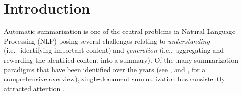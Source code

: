 \section{Introduction}

Automatic summarization is one of the central problems in Natural
Language Processing (NLP) posing several challenges relating to {\em
  understanding} (i.e.,~identifying important content) and {\em
  generation} (i.e.,~aggregating and rewording the identified
content into a summary). Of the many summarization paradigms that have
been identified over the years (see \citeauthor{mani2001automatic},
\citeyear{mani2001automatic} and \citeauthor{Nenkova:McKeown:2011},
\citeyear{Nenkova:McKeown:2011} for a comprehensive overview),
single-document summarization has consistently attracted attention
\cite{jp-acl16,durrett-nyt-ext,nallapati-signll16,nallapati17,see-acl17,tanwan-acl17,narayan-arxiv17,Fan2017Controllable,paulus-socher-arxiv17,Pasunuru-multireward18,asli-multiagent18,narayan-sidenet18,narayan-rank18}.


